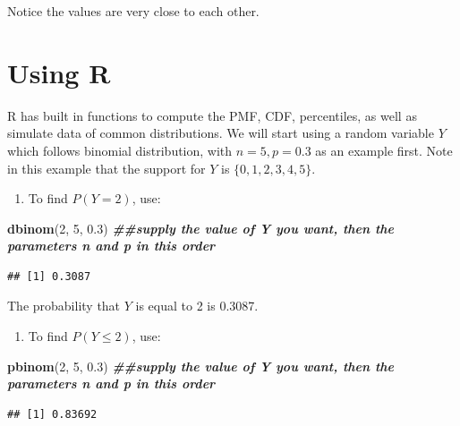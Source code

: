 \documentclass[
]{book}
\newenvironment{Shaded}{\begin{snugshade}}{\end{snugshade}}
\newcommand{\DecValTok}[1]{\textcolor[rgb]{0.00,0.00,0.81}{#1}}
\newcommand{\DocumentationTok}[1]{\textcolor[rgb]{0.56,0.35,0.01}{\textbf{\textit{#1}}}}
\newcommand{\FloatTok}[1]{\textcolor[rgb]{0.00,0.00,0.81}{#1}}
\newcommand{\FunctionTok}[1]{\textcolor[rgb]{0.13,0.29,0.53}{\textbf{#1}}}
\newcommand{\NormalTok}[1]{#1}
\providecommand{\tightlist}{%
  \setlength{\itemsep}{0pt}\setlength{\parskip}{0pt}}
\begin{document}
Notice the values are very close to each other.

\section{Using R}\label{using-r}

R has built in functions to compute the PMF, CDF, percentiles, as well as simulate data of common distributions. We will start using a random variable \(Y\) which follows binomial distribution, with \(n=5, p = 0.3\) as an example first. Note in this example that the support for \(Y\) is \(\{0,1,2,3,4,5 \}\).

\begin{enumerate}
\def\labelenumi{\arabic{enumi}.}
\tightlist
\item
  To find \(P(Y=2)\), use:
\end{enumerate}

\begin{Shaded}
\begin{Highlighting}[]
\FunctionTok{dbinom}\NormalTok{(}\DecValTok{2}\NormalTok{, }\DecValTok{5}\NormalTok{, }\FloatTok{0.3}\NormalTok{) }\DocumentationTok{\#\#supply the value of Y you want, then the parameters n and p in this order}
\end{Highlighting}
\end{Shaded}

\begin{verbatim}
## [1] 0.3087
\end{verbatim}

The probability that \(Y\) is equal to 2 is 0.3087.

\begin{enumerate}
\def\labelenumi{\arabic{enumi}.}
\setcounter{enumi}{1}
\tightlist
\item
  To find \(P(Y \leq 2)\), use:
\end{enumerate}

\begin{Shaded}
\begin{Highlighting}[]
\FunctionTok{pbinom}\NormalTok{(}\DecValTok{2}\NormalTok{, }\DecValTok{5}\NormalTok{, }\FloatTok{0.3}\NormalTok{) }\DocumentationTok{\#\#supply the value of Y you want, then the parameters n and p in this order}
\end{Highlighting}
\end{Shaded}

\begin{verbatim}
## [1] 0.83692
\end{verbatim}
\end{document}
